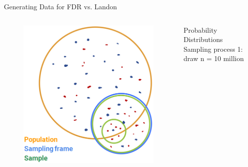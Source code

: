 \documentclass[aspectratio=169]{../latex_main/tntbeamer}  %
\begin{document}
	
		\begin{frame}{Generating Data for FDR vs. Landon}
	    \begin{columns}
	        \begin{column}{.4\textwidth}
	       
	           \begin{figure}
	               \includegraphics[scale=.37]{Bild13}
	           \end{figure}
	        \end{column}
	        
	        \begin{column}{.4\textwidth}
	           Probability Distributions\\
	           Sampling process 1: draw n = 10 million


\end{column}
\end{columns}
\end{frame}
\end{document}
